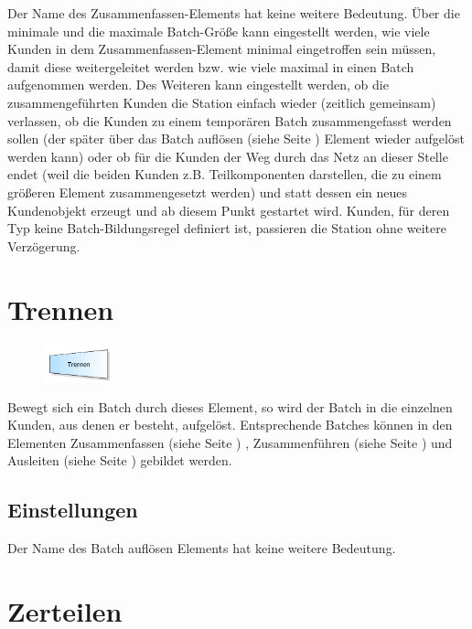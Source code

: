 Der Name des Zusammenfassen-Elements hat keine weitere Bedeutung. Über die minimale und die maximale Batch-Größe kann
eingestellt werden, wie viele Kunden in dem Zusammenfassen-Element minimal eingetroffen sein müssen, damit diese 
weitergeleitet werden bzw. wie viele maximal in einen Batch aufgenommen werden. Des Weiteren kann eingestellt werden,
ob die zusammengeführten Kunden die Station einfach wieder (zeitlich gemeinsam) verlassen, ob die Kunden zu einem temporären
Batch zusammengefasst werden sollen (der später über das Batch auflösen (siehe Seite \pageref{ref:ModelElementSeparate}) Element
wieder aufgelöst werden kann) oder ob für die Kunden der Weg durch
das Netz an dieser Stelle endet (weil die beiden Kunden z.B. Teilkomponenten darstellen, die zu einem größeren Element
zusammengesetzt werden) und statt dessen ein neues Kundenobjekt erzeugt und ab diesem Punkt gestartet wird.
Kunden, für deren Typ keine Batch-Bildungsregel definiert ist, passieren die Station ohne weitere Verzögerung.


\section{Trennen}
\label{ref:ModelElementSeparate}

\begin{figure}
\vspace{-22pt}
\includegraphics[width=2cm]{imageModelElementSeparate.png}
\vspace{-22pt}
\end{figure}

Bewegt sich ein Batch durch dieses Element, so wird der Batch in die einzelnen Kunden, aus denen er
besteht, aufgelöst. Entsprechende Batches können in den Elementen Zusammenfassen (siehe Seite \pageref{ref:ModelElementBatch}) ,
Zusammenführen (siehe Seite \pageref{ref:ModelElementMatch}) und Ausleiten (siehe Seite \pageref{ref:ModelElementPickUp}) 
gebildet werden.

\subsection*{Einstellungen}

Der Name des Batch auflösen Elements hat keine weitere Bedeutung.


\section{Zerteilen}
\label{ref:ModelElementSplit}

